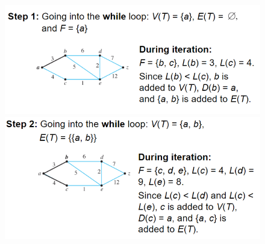 \documentclass{report}
\begin{document}
\begin{figure}[ht]
\centering
\begin{minipage}{.42\textwidth}
  \centering
  \includegraphics[width=\linewidth]{step1.png}
\end{minipage}\hfill
\begin{minipage}{.4\textwidth}
  \centering
  \includegraphics[width=\linewidth]{step2.png}
\end{minipage}
\end{figure}
\pagebreak
\end{document}
